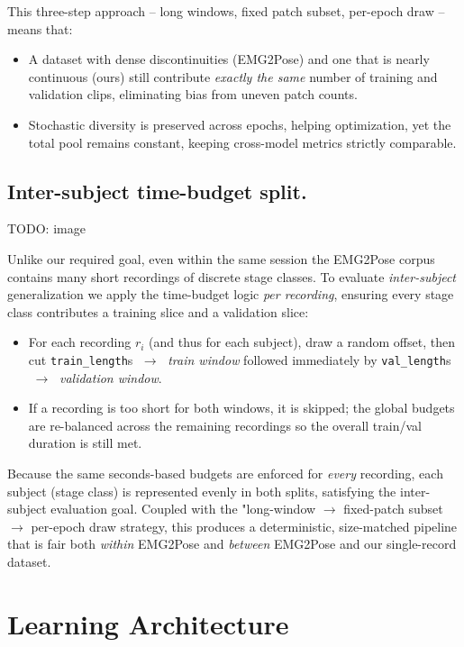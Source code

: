 This three-step approach -- long windows, fixed patch subset, per-epoch draw -- means
that:

\begin{itemize}
  \item A dataset with dense discontinuities (EMG2Pose) and one that is
        nearly continuous (ours) still contribute \emph{exactly the same}
        number of training and validation clips, eliminating bias from
        uneven patch counts.
  \item Stochastic diversity is preserved across epochs, helping optimization,
        yet the total pool remains constant, keeping cross-model metrics
        strictly comparable.
\end{itemize}

\subsection{Inter-subject time-budget split.}
TODO: image

Unlike our required goal, even within the same session the EMG2Pose corpus contains many short recordings of discrete stage classes.
To evaluate \emph{inter-subject} generalization we apply the time-budget logic \emph{per recording}, ensuring every stage class contributes
a training slice and a validation slice:

\begin{itemize}
  \item For each recording $r_{i}$ (and thus for each subject), draw  
        a random offset, then cut
        \texttt{train\_length}s $\;\to\;$ \emph{train window}
        followed immediately by
        \texttt{val\_length}s $\;\to\;$ \emph{validation window}.
  \item If a recording is too short for both windows, it is skipped; the global
        budgets are re-balanced across the remaining recordings so the overall
        train/val duration is still met.
\end{itemize}

Because the same seconds-based budgets are enforced for \emph{every} recording,
each subject (stage class) is represented evenly in both splits, satisfying the
inter-subject evaluation goal. Coupled with the "long-window $\to$ fixed-patch
subset $\to$ per-epoch draw strategy, this produces a deterministic,
size-matched pipeline that is fair both \emph{within} EMG2Pose and \emph{between}
EMG2Pose and our single-record dataset.

\section{Learning Architecture}

